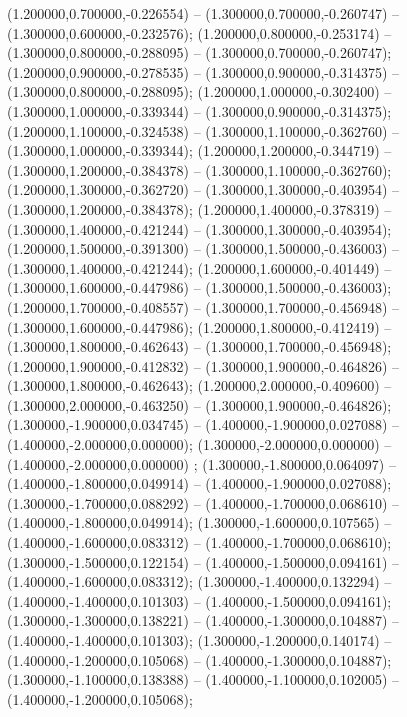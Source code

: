  (1.200000,0.700000,-0.226554) -- (1.300000,0.700000,-0.260747) -- (1.300000,0.600000,-0.232576);
 (1.200000,0.800000,-0.253174) -- (1.300000,0.800000,-0.288095) -- (1.300000,0.700000,-0.260747);
 (1.200000,0.900000,-0.278535) -- (1.300000,0.900000,-0.314375) -- (1.300000,0.800000,-0.288095);
 (1.200000,1.000000,-0.302400) -- (1.300000,1.000000,-0.339344) -- (1.300000,0.900000,-0.314375);
 (1.200000,1.100000,-0.324538) -- (1.300000,1.100000,-0.362760) -- (1.300000,1.000000,-0.339344);
 (1.200000,1.200000,-0.344719) -- (1.300000,1.200000,-0.384378) -- (1.300000,1.100000,-0.362760);
 (1.200000,1.300000,-0.362720) -- (1.300000,1.300000,-0.403954) -- (1.300000,1.200000,-0.384378);
 (1.200000,1.400000,-0.378319) -- (1.300000,1.400000,-0.421244) -- (1.300000,1.300000,-0.403954);
 (1.200000,1.500000,-0.391300) -- (1.300000,1.500000,-0.436003) -- (1.300000,1.400000,-0.421244);
 (1.200000,1.600000,-0.401449) -- (1.300000,1.600000,-0.447986) -- (1.300000,1.500000,-0.436003);
 (1.200000,1.700000,-0.408557) -- (1.300000,1.700000,-0.456948) -- (1.300000,1.600000,-0.447986);
 (1.200000,1.800000,-0.412419) -- (1.300000,1.800000,-0.462643) -- (1.300000,1.700000,-0.456948);
 (1.200000,1.900000,-0.412832) -- (1.300000,1.900000,-0.464826) -- (1.300000,1.800000,-0.462643);
 (1.200000,2.000000,-0.409600) -- (1.300000,2.000000,-0.463250) -- (1.300000,1.900000,-0.464826);
 (1.300000,-1.900000,0.034745) -- (1.400000,-1.900000,0.027088) -- (1.400000,-2.000000,0.000000);
 (1.300000,-2.000000,0.000000) -- (1.400000,-2.000000,0.000000) ;
 (1.300000,-1.800000,0.064097) -- (1.400000,-1.800000,0.049914) -- (1.400000,-1.900000,0.027088);
 (1.300000,-1.700000,0.088292) -- (1.400000,-1.700000,0.068610) -- (1.400000,-1.800000,0.049914);
 (1.300000,-1.600000,0.107565) -- (1.400000,-1.600000,0.083312) -- (1.400000,-1.700000,0.068610);
 (1.300000,-1.500000,0.122154) -- (1.400000,-1.500000,0.094161) -- (1.400000,-1.600000,0.083312);
 (1.300000,-1.400000,0.132294) -- (1.400000,-1.400000,0.101303) -- (1.400000,-1.500000,0.094161);
 (1.300000,-1.300000,0.138221) -- (1.400000,-1.300000,0.104887) -- (1.400000,-1.400000,0.101303);
 (1.300000,-1.200000,0.140174) -- (1.400000,-1.200000,0.105068) -- (1.400000,-1.300000,0.104887);
 (1.300000,-1.100000,0.138388) -- (1.400000,-1.100000,0.102005) -- (1.400000,-1.200000,0.105068);
